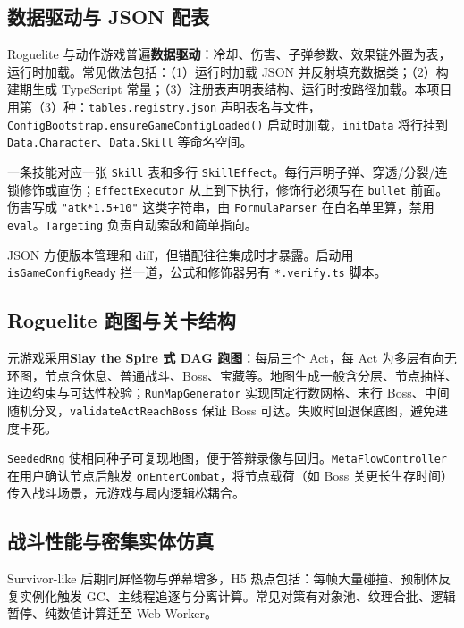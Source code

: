 \subsection{数据驱动与 JSON 配表}

Roguelite 与动作游戏普遍\textbf{数据驱动}：冷却、伤害、子弹参数、效果链外置为表，运行时加载\cite{gregory2018game}。常见做法包括：（1）运行时加载 JSON 并反射填充数据类；（2）构建期生成 TypeScript 常量；（3）注册表声明表结构、运行时按路径加载。本项目用第（3）种：\texttt{tables.registry.json} 声明表名与文件，\texttt{ConfigBootstrap.ensureGameConfigLoaded()} 启动时加载，\texttt{initData} 将行挂到 \texttt{Data.Character}、\texttt{Data.Skill} 等命名空间。

一条技能对应一张 \texttt{Skill} 表和多行 \texttt{SkillEffect}。每行声明子弹、穿透/分裂/连锁修饰或直伤；\texttt{EffectExecutor} 从上到下执行，修饰行必须写在 \texttt{bullet} 前面。伤害写成 \texttt{"atk*1.5+10"} 这类字符串，由 \texttt{FormulaParser} 在白名单里算，禁用 \texttt{eval}。\texttt{Targeting} 负责自动索敌和简单指向。

JSON 方便版本管理和 diff，但错配往往集成时才暴露。启动用 \texttt{isGameConfigReady} 拦一道，公式和修饰器另有 \texttt{*.verify.ts} 脚本。

\subsection{Roguelite 跑图与关卡结构}

元游戏采用\textbf{Slay the Spire 式 DAG 跑图}：每局三个 Act，每 Act 为多层有向无环图，节点含休息、普通战斗、Boss、宝藏等\cite{gregory2018game}。地图生成一般含分层、节点抽样、连边约束与可达性校验；\texttt{RunMapGenerator} 实现固定行数网格、末行 Boss、中间随机分叉，\texttt{validateActReachBoss} 保证 Boss 可达。失败时回退保底图，避免进度卡死。

\texttt{SeededRng} 使相同种子可复现地图，便于答辩录像与回归。\texttt{MetaFlowController} 在用户确认节点后触发 \texttt{onEnterCombat}，将节点载荷（如 Boss 关更长生存时间）传入战斗场景，元游戏与局内逻辑松耦合。

\subsection{战斗性能与密集实体仿真}

Survivor-like 后期同屏怪物与弹幕增多，H5 热点包括：每帧大量碰撞、预制体反复实例化触发 GC、主线程追逐与分离计算。常见对策有对象池、纹理合批、逻辑暂停、纯数值计算迁至 Web Worker\cite{gregory2018game,mckenzie2008crowd}。

